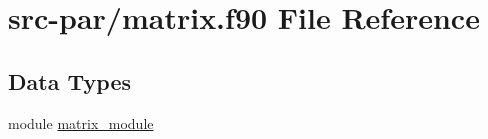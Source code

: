 \hypertarget{matrix_8f90}{\section{src-\/par/matrix.f90 File Reference}
\label{matrix_8f90}
}
\subsection*{Data Types}
\begin{DoxyCompactItemize}
\item 
module \hyperlink{classmatrix__module}{matrix\-\_\-module}
\end{DoxyCompactItemize}
